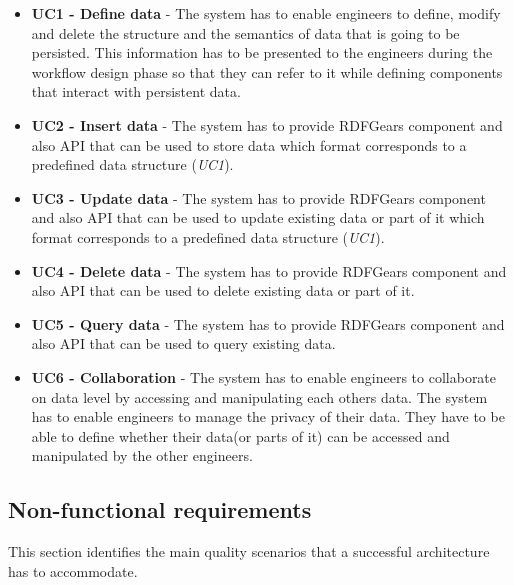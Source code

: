 \documentclass[a4paper, notitlepage]{article}
\begin{document}
\begin{itemize}
	\item \textbf{UC1 - Define data } - The system has to enable engineers to define, modify and delete the structure and the semantics of data that is going to be persisted. This information has to be presented to the engineers during the workflow design phase so that they can refer to it while defining components that interact with persistent data. 
	
	\item \textbf{UC2 - Insert data} - The system has to provide RDFGears component and also API that can be used to store data which format corresponds to a predefined data structure (\textit{UC1}).

	\item \textbf{UC3 - Update data } - The system has to provide RDFGears component and also API that can be used to update existing data or part of it which format corresponds to a predefined data structure (\textit{UC1}).
	
	\item \textbf{UC4 - Delete data} - The system has to provide RDFGears component and also API that can be used to delete existing data or part of it.
	
	\item \textbf{UC5 - Query data} - The system has to provide RDFGears component and also API that can be used to query existing data.
	
	\item \textbf{UC6 - Collaboration} - The system has to enable engineers to collaborate on data level by accessing and manipulating each others data. The system has to enable engineers to manage the privacy of their data. They have to be able to define whether their data(or parts of it) can be accessed and manipulated by the other engineers.

\end{itemize}

\subsection{Non-functional requirements}
This section identifies the main quality scenarios that a successful architecture has to accommodate.
\end{document}
